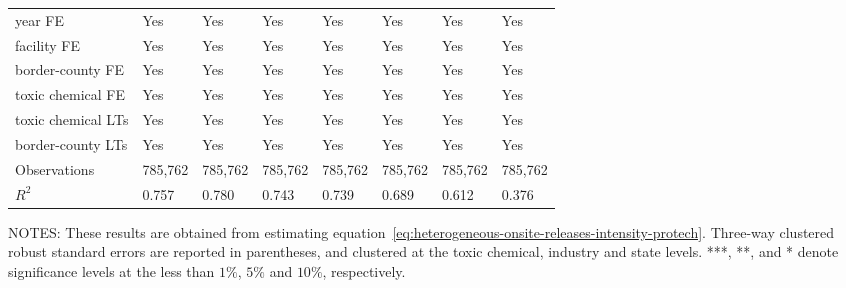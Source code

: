 \begin{table}[H]
{\begin{tabular}{@{}llllllll@{}}
            year FE                         & Yes       & Yes           & Yes       & Yes          & Yes             & Yes           & Yes                 \\
            facility FE                     & Yes       & Yes           & Yes       & Yes          & Yes             & Yes           & Yes                 \\
            border-county FE                & Yes       & Yes           & Yes       & Yes          & Yes             & Yes           & Yes                 \\
            toxic chemical FE               & Yes       & Yes           & Yes       & Yes          & Yes             & Yes           & Yes                 \\
            toxic chemical LTs              & Yes       & Yes           & Yes       & Yes          & Yes             & Yes           & Yes                 \\
            border-county LTs               & Yes       & Yes           & Yes       & Yes          & Yes             & Yes           & Yes                 \\\midrule
            Observations                    & 785,762   & 785,762       & 785,762   & 785,762      & 785,762         & 785,762       & 785,762             \\
            $R^2$                           & 0.757     & 0.780         & 0.743     & 0.739        & 0.689           & 0.612         & 0.376               \\ \bottomrule \bottomrule
        \end{tabular}%
    }
    \begin{minipage}{\columnwidth}
        \vspace{0.05in}
        \tiny NOTES: These results are obtained from estimating equation~\ref{eq:heterogeneous-onsite-releases-intensity-protech}. Three-way clustered robust standard errors are reported in parentheses, and clustered at the toxic chemical, industry and state levels. ***, **, and * denote significance levels at the less than $1\%$, $5\%$ and $10\%$, respectively.
    \end{minipage}
\end{table}